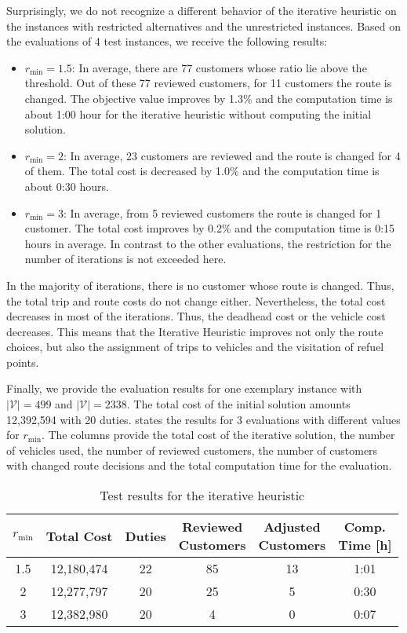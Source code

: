 Surprisingly, we do not recognize a different behavior of the iterative heuristic on the instances with restricted alternatives and the unrestricted instances. Based on the evaluations of 4 test instances, we receive the following results:
\begin{itemize}
	\item{$r_{\min} = 1.5$:}
In average, there are 77 customers whose ratio lie above the threshold. Out of these 77 reviewed customers, for 11 customers the route is changed. The objective value improves by 1.3\% and the computation time is about 1:00 hour for the iterative heuristic without computing the initial solution.
	\item{$r_{\min} = 2$:}
In average, 23 customers are reviewed and the route is changed for 4 of them. The total cost is decreased by 1.0\% and the computation time is about 0:30 hours.
	\item{$r_{\min} = 3$:}
In average, from 5 reviewed customers the route is changed for 1 customer. The total cost improves by 0.2\% and the computation time is 0:15 hours in average. In contrast to the other evaluations, the restriction for the number of iterations is not exceeded here.
\end{itemize}

In the majority of iterations, there is no customer whose route is changed. Thus, the total trip and route costs do not change either. Nevertheless, the total cost decreases in most of the iterations. Thus, the deadhead cost or the vehicle cost decreases. This means that the Iterative Heuristic improves not only the route choices, but also the assignment of trips to vehicles and the visitation of refuel points.

Finally, we provide the evaluation results for one exemplary instance with ${\vert\mathcal{V}\vert=499}$ and ${\vert\mathcal{V}\vert=2338}$. The total cost of the initial solution amounts 12,392,594 with 20 duties.  states the results for 3 evaluations with different values for $r_{\min}$. The columns provide the total cost of the iterative solution, the number of vehicles used, the number of reviewed customers, the number of customers with changed route decisions and the total computation time for the evaluation.

\begin{table}[htb]
	\centering
	\begin{tabular}{ccc c cc}
		\toprule
		$r_{\min}$ & Total Cost & Duties & \parbox[c]{2cm}{\centering Reviewed \\ Customers} & \parbox[c]{2cm}{\centering Adjusted \\ Customers} & \parbox{1.5cm}{\centering Comp. \\ Time [h]} \\
		 & 12,180,474 & 22 & 85 & 13 & 1:01 \\
		2   & 12,277,797 & 20 & 25 & 5  & 0:30 \\
		3   & 12,382,980 & 20 & 4  & 0  & 0:07 \\
		\bottomrule
	\end{tabular}
	\caption{Test results for the iterative heuristic}
	\label{tab:results:iterative}
\end{table}

